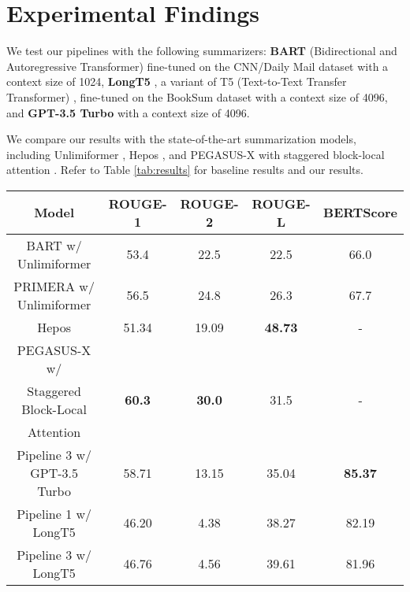 \section{Experimental Findings}
\label{sec:findings}

We test our pipelines with the following summarizers: \textbf{BART} (Bidirectional
and Autoregressive Transformer) \cite{lewis-etal-2020-bart} fine-tuned on the
CNN/Daily Mail dataset \cite{nallapati2016abstractive} with a context size of 1024,
\textbf{LongT5} \cite{guo2021longt5}, a variant of T5 (Text-to-Text Transfer
Transformer) \cite{raffel2020exploring}, fine-tuned on the BookSum dataset with
a context size of 4096, and \textbf{GPT-3.5 Turbo} \cite{brown2020language} with a
context size of 4096.

We compare our results with the state-of-the-art summarization models, including
Unlimiformer \cite{bertsch2023unlimiformer}, Hepos \cite{huang-etal-2021-efficient},
and PEGASUS-X with staggered block-local attention \cite{phang2022investigating}.
Refer to Table \ref{tab:results} for baseline results and our results.

\begin{table*}[!ht]
	\centering

	\begin{tabular}{c c c c c}
		\hline
		\textbf{Model} & \textbf{ROUGE-1} & \textbf{ROUGE-2} & \textbf{ROUGE-L} &
		\textbf{BERTScore} \\
		\hline
		BART w/ Unlimiformer & 53.4 & 22.5 & 22.5 & 66.0 \\
		PRIMERA w/ Unlimiformer & 56.5 & 24.8 & 26.3 & 67.7 \\
		Hepos & 51.34 & 19.09 & \textbf{48.73} & - \\
		PEGASUS-X w/ & & & & \\
		Staggered Block-Local & \textbf{60.3} & \textbf{30.0} & 31.5 & - \\
		Attention & & & & \\
		\hline
		Pipeline 3 w/ GPT-3.5 Turbo & 58.71 & 13.15 & 35.04 & \textbf{85.37} \\
		Pipeline 1 w/ LongT5 & 46.20 & 4.38 & 38.27 & 82.19 \\
		Pipeline 3 w/ LongT5 & 46.76 & 4.56 & 39.61 & 81.96 \\
		\hline
	\end{tabular}

	\caption{Automatic evaluation results on GovReport dataset. The best scores are
	highlighted in \textbf{bold}.}
	\label{tab:results}
\end{table*}

